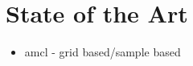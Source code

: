 \documentclass[Thesis.tex]{subfiles}
\begin{document}
\chapter{State of the Art}
\begin{itemize}
	\item amcl - grid based/sample based
\end{itemize}
\end{document}
